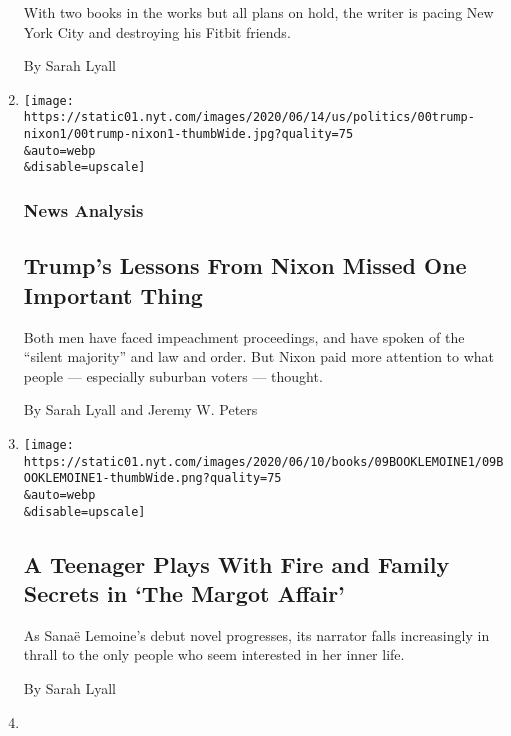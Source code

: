 \begin{enumerate}
  With two books in the works but all plans on hold, the writer is
  pacing New York City and destroying his Fitbit friends.

  By Sarah Lyall
\item
  \href{/2020/06/13/us/politics/trump-lessons-nixon.html}{}

  \texttt{[image: https://static01.nyt.com/images/2020/06/14/us/politics/00trump-nixon1/00trump-nixon1-thumbWide.jpg?quality=75\\\&auto=webp\\\&disable=upscale]}

  \hypertarget{news-analysis-1}{%
  \subsubsection{News Analysis}\label{news-analysis-1}}

  \hypertarget{trumps-lessons-from-nixon-missed-one-important-thing}{%
  \subsection{Trump's Lessons From Nixon Missed One Important
  Thing}\label{trumps-lessons-from-nixon-missed-one-important-thing}}

  Both men have faced impeachment proceedings, and have spoken of the
  ``silent majority'' and law and order. But Nixon paid more attention
  to what people --- especially suburban voters --- thought.

  By Sarah Lyall and Jeremy W. Peters
\item
  \href{/2020/06/09/books/review-margot-affair-sanae-lemoine.html}{}

  \texttt{[image: https://static01.nyt.com/images/2020/06/10/books/09BOOKLEMOINE1/09BOOKLEMOINE1-thumbWide.png?quality=75\\\&auto=webp\\\&disable=upscale]}

  \hypertarget{a-teenager-plays-with-fire-and-family-secrets-in-the-margot-affair}{%
  \subsection{A Teenager Plays With Fire and Family Secrets in `The
  Margot
  Affair'}\label{a-teenager-plays-with-fire-and-family-secrets-in-the-margot-affair}}

  As Sanaë Lemoine's debut novel progresses, its narrator falls
  increasingly in thrall to the only people who seem interested in her
  inner life.

  By Sarah Lyall
\item
  \href{/2020/05/19/books/review/hunger-games-prequel-ballad-of-songbirds-and-snakes.html}{}


\end{enumerate}
